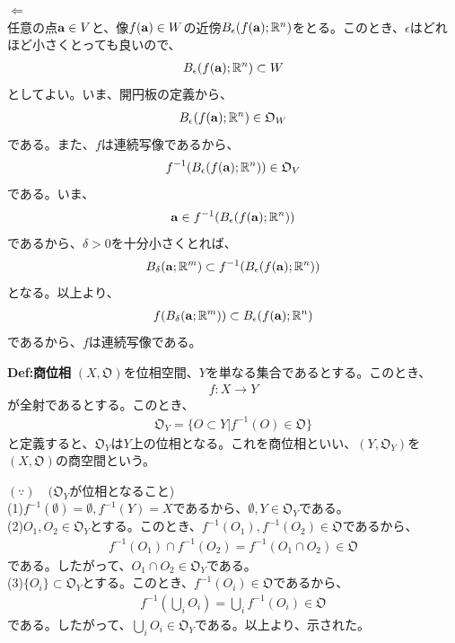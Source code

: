 \documentclass[a4paper,11pt]{jsarticle}
\numberwithin{equation}{section}
\begin{document}
\textbf{$\Leftarrow$}\\
任意の点$\vb{a} \in V$と、像$f(\vb{a}) \in W$の近傍$B_{\epsilon}(f(\vb{a});\mathbb{R}^n)$をとる。このとき、$\epsilon$はどれほど小さくとっても良いので、
\begin{align}
  B_{\epsilon}(f(\vb{a});\mathbb{R}^n) \subset W
\end{align}
としてよい。いま、開円板の定義から、
\begin{align}
  B_{\epsilon}(f(\vb{a});\mathbb{R}^n) \in \mathfrak{O}_W
\end{align}
である。また、$f$は連続写像であるから、
\begin{align}
  f^{-1}(B_{\epsilon}(f(\vb{a});\mathbb{R}^n)) \in \mathfrak{O}_V
\end{align}
である。いま、
\begin{align}
  \vb{a} \in f^{-1}(B_{\epsilon}(f(\vb{a});\mathbb{R}^n))
\end{align}
であるから、$\delta >0$を十分小さくとれば、
\begin{align}
  B_{\delta}(\vb{a};\mathbb{R}^m) \subset f^{-1}(B_{\epsilon}(f(\vb{a});\mathbb{R}^n))
\end{align}
となる。以上より、
\begin{align}
  f(B_{\delta}(\vb{a};\mathbb{R}^m)) \subset B_{\epsilon}(f(\vb{a});\mathbb{R}^n)
\end{align}
であるから、$f$は連続写像である。\hfill\qedsymbol\\

\begin{itembox}[l]{\textbf{Def:商位相}}
  $(X,\mathfrak{O})$を位相空間、$Y$を単なる集合であるとする。このとき、
  \begin{align}
    f:X \to Y
  \end{align}
  が全射であるとする。このとき、
  \begin{align}
    \mathfrak{O}_Y = \{O \subset Y | f^{-1}(O) \in \mathfrak{O}\}
  \end{align}
  と定義すると、$\mathfrak{O}_Y$は$Y$上の位相となる。これを商位相といい、$(Y,\mathfrak{O}_Y)$を$(X,\mathfrak{O})$の商空間という。
\end{itembox}
$(\because) \quad (\mathfrak{O}_Y$が位相となること)\\
(1)$f^{-1}(\emptyset) = \emptyset, f^{-1}(Y) = X$であるから、$\emptyset, Y \in \mathfrak{O}_Y$である。\\
(2)$O_1,O_2 \in \mathfrak{O}_Y$とする。このとき、$f^{-1}(O_1),f^{-1}(O_2) \in \mathfrak{O}$であるから、
\begin{align}
  f^{-1}(O_1) \cap f^{-1}(O_2) = f^{-1}(O_1 \cap O_2) \in \mathfrak{O}
\end{align}
である。したがって、$O_1 \cap O_2 \in \mathfrak{O}_Y$である。\\
(3)$\{O_i\} \subset \mathfrak{O}_Y$とする。このとき、$f^{-1}(O_i) \in \mathfrak{O}$であるから、
\begin{align}
  f^{-1}\left(\bigcup_{i} O_i\right) = \bigcup_{i} f^{-1}(O_i) \in \mathfrak{O}
\end{align}
である。したがって、$\bigcup_{i} O_i \in \mathfrak{O}_Y$である。以上より、示された。\hfill\qedsymbol\\
\end{document}
